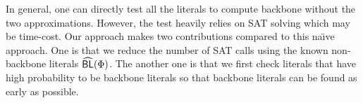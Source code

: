 In general, one can directly test all the literals to compute backbone without the two approximations.
However, the test heavily relies on SAT solving which may be time-cost.
Our approach makes two contributions compared to this na\"{\i}ve approach.
One is that we reduce the number of SAT calls using the known non-backbone literals ${\sf \widehat{BL}}(\Phi)$.
The another one is that we first check literals that have high probability to be backbone literals so that backbone literals can be found as early as possible.

